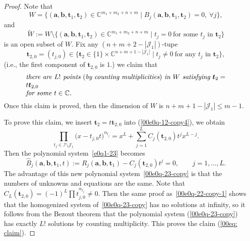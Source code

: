 \documentclass[pdftex]{sigma}
\numberwithin{equation}{section}
\def\C{\mathbb C}
\begin{document}
\begin{proof} Note that
\[W=\bigl\{(\boldsymbol a, \boldsymbol b, \boldsymbol t_1, \boldsymbol t_2)\in \C^{m_1+m_2+n+m}\mid B_j(\boldsymbol a, \boldsymbol b, \boldsymbol t_1, \boldsymbol t_2)=0,\ \forall j\bigr\},\]
and
\[\widetilde{W}:=W\setminus\bigl\{(\boldsymbol a, \boldsymbol b, \boldsymbol t_1, \boldsymbol t_2)\in \C^{m_1+m_2+n+m}\mid t_j=0\ \text{for some $t_j$ in $\boldsymbol t_2$}\bigr\}\]
is an open subset of $W$.
Fix any $(n+m+2-|\mathcal{J}_1|)$-tupe
\[
\boldsymbol t_{2,0}=(t_{j,0})\in \bigl\{\boldsymbol t_2\in \{1\}\times\C^{n+m+1-|\mathcal{J}_1|}\mid t_{j}\neq 0\ \text{for any $t_j$ in $\boldsymbol t_2$}\bigr\},
\]
(i.e., the first component of $\boldsymbol t_{2,0}$ is $1$.) we claim that
\begin{equation} \label{00eq: claim}
 \parbox{\dimexpr\linewidth-5em}{\it
 there are $L!$ points $($by counting multiplicities$)$ in $W$ satisfying $\boldsymbol t_2=t\boldsymbol t_{2,0}$\\ for some~${t\in\mathbb{C}}$.
 }
\end{equation}
Once this claim is proved, then the dimension of $W$ is $n+m+1-|\mathcal{J}_1|\leq m-1$.

To prove this claim, we insert $\boldsymbol t_2=t\boldsymbol t_{2,0}$ into (\ref{00e0q-12-copy4}), we obtain
\begin{equation*}%
\prod_{t_j\in \mathcal{I}\setminus\mathcal{J}_1}\bigl(x-t_{j,0}t\bigr)^{{\alpha}_{t_j}}
=x^{L}
+\sum_{j=1}^{L}
C_j(\boldsymbol t_{2,0})t^jx^{L-j}.\end{equation*}
Then the polynomial system~\eqref{e0q1-23} becomes
\begin{equation}\label{00e0q-23-copy}
\widehat{B}_j(\boldsymbol a, \boldsymbol b,\boldsymbol t_1, t):=R_{j}(\boldsymbol a, \boldsymbol b,\boldsymbol t_1)-C_j(\boldsymbol t_{2,0})t^j=0,\qquad j=1,\dots, L.
\end{equation}
The advantage of this new polynomial system~\eqref{00e0q-23-copy} is that
the numbers of unknowns and equations are the same. Note that $C_{L}(\boldsymbol t_{2,0})=(-1)^{L}\prod t_{j,0}^{{\alpha}_{t_j}}\neq 0$.
Then the same proof as~\eqref{00e0q-22-copy-1} shows that the homogenized system of~\eqref{00e0q-23-copy} has no solutions at infinity, so it follows from the Bezout theorem that the polynomial system (\ref{00e0q-23-copy}) has exactly
$L!$
solutions by counting multiplicity. This proves the claim (\ref{00eq: claim}).
\end{proof}
\end{document}
